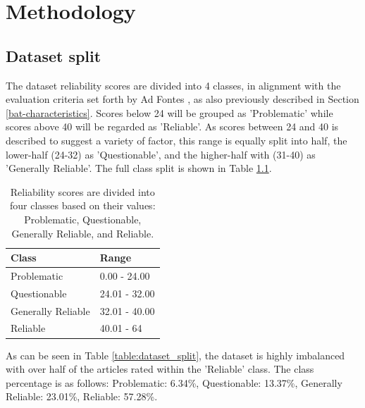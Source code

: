 \chapter{Methodology}
\label{cha:4}

\section{Dataset split}

The dataset reliability scores are divided into 4 classes, in alignment with the evaluation criteria set forth by Ad Fontes \cite{adfontes-bias-reliability}, as also previously described in Section \ref{bat-characteristics}. Scores below 24 will be grouped as 'Problematic' while scores above 40 will be regarded as 'Reliable'. As scores between 24 and 40 is described to suggest a variety of factor, this range is equally split into half, the lower-half (24-32) as 'Questionable', and the higher-half with (31-40) as 'Generally Reliable'. The full class split is shown in Table \ref{table:label_split}.

\begin{table}[htbp]
    \centering
    \begin{tabular}{| l | l |}
        \hline
        Class              & Range         \\
        \hline
        Problematic        & 0.00 - 24.00  \\
        Questionable       & 24.01 - 32.00 \\
        Generally Reliable & 32.01 - 40.00 \\
        Reliable           & 40.01 - 64    \\
        \hline
    \end{tabular}
    \caption{Reliability scores are divided into four classes based on their values: Problematic, Questionable, Generally Reliable, and Reliable.}
    \label{table:label_split}
\end{table}

As can be seen in Table \ref{table:dataset_split}, the dataset is highly imbalanced with over half of the articles rated within the 'Reliable' class. The class percentage is as follows: Problematic: 6.34\%, Questionable: 13.37\%, Generally Reliable: 23.01\%, Reliable: 57.28\%.

